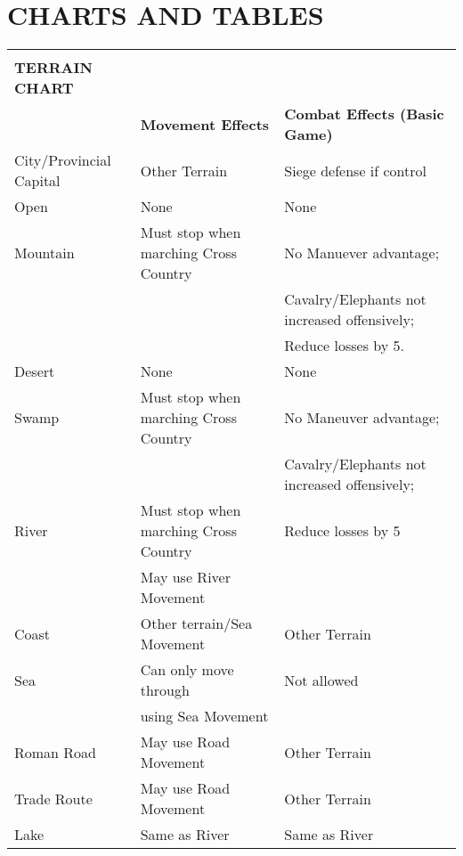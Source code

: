 \clearpage
\section{CHARTS AND TABLES}

\begin{strip}
  \begin{tabular}{|lll|}
    \hline & &\\[-2.0ex]
    \textbf{TERRAIN CHART} & &\\
    & \textbf{Movement Effects} & \textbf{Combat Effects (Basic Game)}\\
    City/Provincial Capital & Other Terrain & Siege defense if control\\
    \rowcolor{BabyBlue}Open & None & None\\
    Mountain & Must stop when marching Cross Country & No Manuever advantage;\\
    & & Cavalry/Elephants not increased offensively;\\
    & & Reduce losses by 5.\\
    \rowcolor{BabyBlue}Desert & None & None\\
    Swamp & Must stop when marching Cross Country & No Maneuver advantage;\\
    & & Cavalry/Elephants not increased offensively;\\
    \rowcolor{BabyBlue}River & Must stop when marching Cross Country & Reduce losses by 5\\
    \rowcolor{BabyBlue}& May use River Movement &\\
    Coast & Other terrain/Sea Movement & Other Terrain\\
    \rowcolor{BabyBlue}Sea & Can only move through & Not allowed\\
    \rowcolor{BabyBlue}& using Sea Movement &\\
    Roman Road & May use Road Movement & Other Terrain\\
    \rowcolor{BabyBlue}Trade Route & May use Road Movement & Other Terrain\\
    Lake & Same as River & Same as River\\
    \hline
  \end{tabular}
\end{strip}

